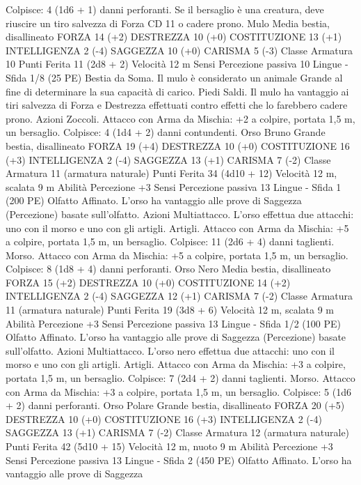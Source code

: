 \begin{multicols}{2}
Colpisce: 4 (1d6 + 1) danni perforanti. Se il bersaglio è una creatura,
deve riuscire un tiro salvezza di Forza CD 11 o cadere prono.
Mulo
Media bestia, disallineato
FORZA 14 (+2)
DESTREZZA 10 (+0)
COSTITUZIONE 13 (+1)
INTELLIGENZA 2 (-4)
SAGGEZZA 10 (+0)
CARISMA 5 (-3)
Classe Armatura 10
Punti Ferita 11 (2d8 + 2)
Velocità 12 m
Sensi Percezione passiva 10
Lingue -
Sfida 1/8 (25 PE)
Bestia da Soma. Il mulo è considerato un animale Grande al fine
di determinare la sua capacità di carico.
Piedi Saldi. Il mulo ha vantaggio ai tiri salvezza di Forza e
Destrezza effettuati contro effetti che lo farebbero cadere prono.
Azioni
Zoccoli. Attacco con Arma da Mischia: +2 a colpire, portata 1,5
m, un bersaglio.
Colpisce: 4 (1d4 + 2) danni contundenti.
Orso Bruno
Grande bestia, disallineato
FORZA 19 (+4)
DESTREZZA 10 (+0)
COSTITUZIONE 16 (+3)
INTELLIGENZA 2 (-4)
SAGGEZZA 13 (+1)
CARISMA 7 (-2)
Classe Armatura 11 (armatura naturale)
Punti Ferita 34 (4d10 + 12)
Velocità 12 m, scalata 9 m
Abilità Percezione +3
Sensi Percezione passiva 13
Lingue -
Sfida 1 (200 PE)
Olfatto Affinato. L’orso ha vantaggio alle prove di Saggezza
(Percezione) basate sull’olfatto.
Azioni
Multiattacco. L’orso effettua due attacchi: uno con il morso e
uno con gli artigli.
Artigli. Attacco con Arma da Mischia: +5 a colpire, portata 1,5
m, un bersaglio.
Colpisce: 11 (2d6 + 4) danni taglienti.
Morso. Attacco con Arma da Mischia: +5 a colpire, portata 1,5
m, un bersaglio.
Colpisce: 8 (1d8 + 4) danni perforanti.
Orso Nero
Media bestia, disallineato
FORZA 15 (+2)
DESTREZZA 10 (+0)
COSTITUZIONE 14 (+2)
INTELLIGENZA 2 (-4)
SAGGEZZA 12 (+1)
CARISMA 7 (-2)
Classe Armatura 11 (armatura naturale)
Punti Ferita 19 (3d8 + 6)
Velocità 12 m, scalata 9 m
Abilità Percezione +3
Sensi Percezione passiva 13
Lingue -
Sfida 1/2 (100 PE)
Olfatto Affinato. L’orso ha vantaggio alle prove di Saggezza
(Percezione) basate sull’olfatto.
Azioni
Multiattacco. L’orso nero effettua due attacchi: uno con il morso
e uno con gli artigli.
Artigli. Attacco con Arma da Mischia: +3 a colpire, portata 1,5
m, un bersaglio.
Colpisce: 7 (2d4 + 2) danni taglienti.
Morso. Attacco con Arma da Mischia: +3 a colpire, portata 1,5
m, un bersaglio.
Colpisce: 5 (1d6 + 2) danni perforanti.
Orso Polare
Grande bestia, disallineato
FORZA 20 (+5)
DESTREZZA 10 (+0)
COSTITUZIONE 16 (+3)
INTELLIGENZA 2 (-4)
SAGGEZZA 13 (+1)
CARISMA 7 (-2)
Classe Armatura 12 (armatura naturale)
Punti Ferita 42 (5d10 + 15)
Velocità 12 m, nuoto 9 m
Abilità Percezione +3
Sensi Percezione passiva 13
Lingue -
Sfida 2 (450 PE)
Olfatto Affinato. L’orso ha vantaggio alle prove di Saggezza

\end{multicols}
